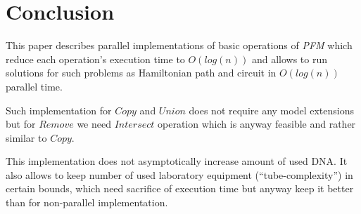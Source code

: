 \section{Conclusion}\label{conclusion}
This paper describes parallel implementations of basic operations of \emph{PFM} which reduce each operation's execution time to $O(log(n))$ and allows to run solutions for such problems as Hamiltonian path and circuit in $O(log(n))$ parallel time.

Such implementation for $Copy$ and $Union$ does not require any model extensions but for $Remove$ we need $Intersect$ operation which is anyway feasible and rather similar to $Copy$.

This implementation does not asymptotically increase amount of used DNA. It also allows to keep number of used laboratory equipment (``tube-complexity'') in certain bounds, which need sacrifice of execution time but anyway keep it better than for non-parallel implementation.